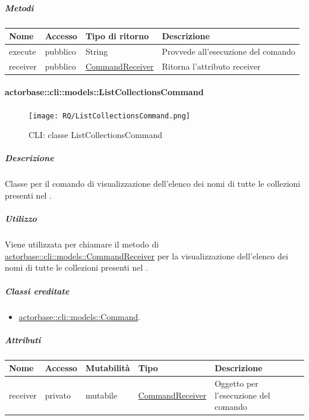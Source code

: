 \documentclass{scalatekids-article}
\begin{document}
\subparagraph{Metodi}

\begin{tabular}{| l | l | l | l |}
  \hline
  Nome & Accesso & Tipo di ritorno & Descrizione\\
  \hline
  execute & pubblico & String & Provvede all'esecuzione del comando\\
  \hline
  receiver & pubblico & \hyperref[sec:actorbase::cli::models::CommandReceiver]{CommandReceiver} & Ritorna l'attributo receiver\\
  \hline
\end{tabular}

\paragraph{actorbase::cli::models::ListCollectionsCommand}
\label{sec:actorbase::cli::models::ListCollectionsCommand}

\begin{figure}[H]
  \begin{center}
    \texttt{[image: RQ/ListCollectionsCommand.png]}
    \caption{CLI: classe ListCollectionsCommand}
  \end{center}
\end{figure}

\subparagraph{Descrizione}

Classe per il comando di visualizzazione dell'elenco dei nomi di tutte le
collezioni presenti nel .

\subparagraph{Utilizzo}

Viene utilizzata per chiamare il metodo di
\hyperref[sec:actorbase::cli::models::CommandReceiver]{actorbase::cli::models::CommandReceiver} per la visualizzazione dell'elenco dei
nomi di tutte le collezioni presenti nel .

\subparagraph{Classi ereditate}

\begin{itemize}
\item \hyperref[sec:actorbase::cli::models::Command]{actorbase::cli::models::Command}.
\end{itemize}

\subparagraph{Attributi}

\begin{tabular}{| p{1cm} | p{1.5cm} | p{2cm} | p{4cm} | p{8.5cm} |}
  \hline
  Nome & Accesso & Mutabilità & Tipo & Descrizione\\
  \hline
  receiver & privato & mutabile & \hyperref[sec:actorbase::cli::models::CommandReceiver]{CommandReceiver} & Oggetto per l'esecuzione del comando\\
  \hline
\end{tabular}
\end{document}
